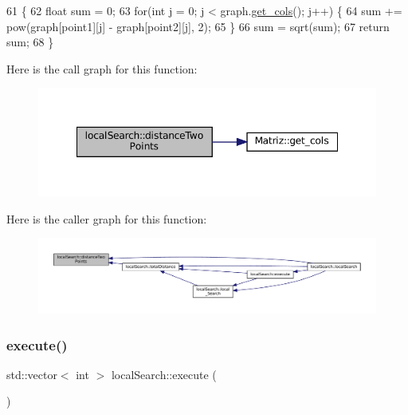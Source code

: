 \begin{DoxyCode}
61                                                            \{
62   \textcolor{keywordtype}{float} sum = 0; 
63   \textcolor{keywordflow}{for}(\textcolor{keywordtype}{int} j = 0; j < graph.\hyperlink{classMatriz_ad6915f9b31f93230a3ce05d01d23a47b}{get\_cols}(); j++) \{
64     sum += pow(graph[point1][j] - graph[point2][j], 2);
65   \}
66   sum = sqrt(sum);
67   \textcolor{keywordflow}{return} sum;
68 \}
\end{DoxyCode}
Here is the call graph for this function\+:
\nopagebreak
\begin{figure}[H]
\begin{center}
\leavevmode
\includegraphics[width=348pt]{classlocalSearch_a5e85839cfb397c2ee38fa38bfbbc4151_cgraph}
\end{center}
\end{figure}
Here is the caller graph for this function\+:
\nopagebreak
\begin{figure}[H]
\begin{center}
\leavevmode
\includegraphics[width=350pt]{classlocalSearch_a5e85839cfb397c2ee38fa38bfbbc4151_icgraph}
\end{center}
\end{figure}
\mbox{\label{classlocalSearch_a0ac1d7bf221f1ab7af92f1a91017cf02}} 
\subsubsection{\texorpdfstring{execute()}{execute()}}
{\footnotesize\ttfamily std\+::vector$<$ int $>$ local\+Search\+::execute (\begin{DoxyParamCaption}{ }\end{DoxyParamCaption})\hspace{0.3cm}{\ttfamily [virtual]}}



